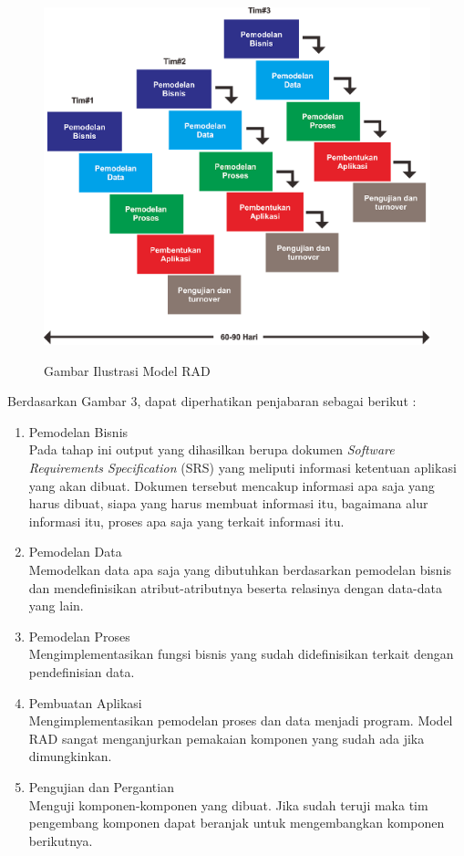 \begin{flushleft}
\begin{justify}
\begin{figure}[ht]
	    \includegraphics[width=12cm]{images/RAD.png}\\
            \caption{Gambar Ilustrasi Model RAD}
        \end{figure}
        Berdasarkan Gambar 3, dapat diperhatikan penjabaran sebagai berikut :
        \begin{enumerate}[label=\alph*.]
            \item Pemodelan Bisnis\\
            Pada tahap ini output yang dihasilkan berupa dokumen \textit{Software Requirements Specification} (SRS) yang meliputi informasi ketentuan aplikasi yang akan dibuat. Dokumen tersebut mencakup informasi apa saja yang harus dibuat, siapa yang harus membuat informasi itu, bagaimana alur informasi itu, proses apa saja yang terkait informasi itu.
            \item Pemodelan Data\\
            Memodelkan data apa saja yang dibutuhkan berdasarkan pemodelan bisnis dan mendefinisikan atribut-atributnya beserta relasinya dengan data-data yang lain. 
            \item Pemodelan Proses\\
            Mengimplementasikan fungsi bisnis yang sudah didefinisikan terkait dengan pendefinisian data. 
            \item Pembuatan Aplikasi\\
            Mengimplementasikan pemodelan proses dan data menjadi program. Model RAD sangat menganjurkan pemakaian komponen yang sudah ada jika dimungkinkan.
            \item Pengujian dan Pergantian\\
            Menguji komponen-komponen yang dibuat. Jika sudah teruji maka tim pengembang komponen dapat beranjak untuk mengembangkan komponen berikutnya.\\
        \end{enumerate}


\end{justify}
\end{flushleft}
